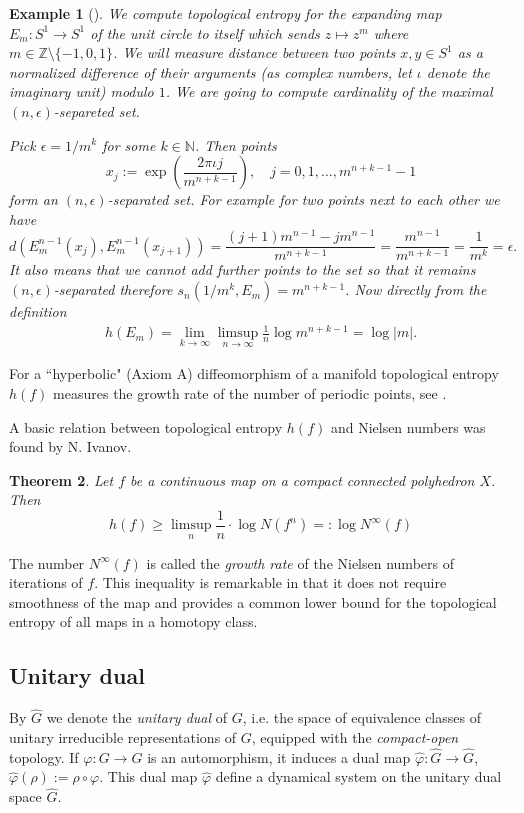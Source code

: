 \documentclass[12pt, a4paper]{amsart}
\def\r{\rho}
\newcommand{\wh}[1]{\widehat{#1}}
\newtheorem{theorem}{Theorem}
\newtheorem{example}[theorem]{Example}
\begin{document}
\begin{example}[]\label{ex:entropy-computation}
  We compute topological entropy for the expanding map $E_m: S^1 \to S^1$
  of the unit circle to itself which sends $z \mapsto z^m$ where $m \in \mathbb{Z} \setminus \{-1,0,1\}$.
  We will measure distance between two points $x,y \in S^1$ as a normalized difference of their arguments
  (as complex numbers, let $\iota$ denote the imaginary unit) modulo $1$.
  We are going to compute cardinality of the maximal $(n,\epsilon)$-separeted set.

  Pick $\epsilon = 1/m^{k}$ for some $k \in \mathbb{N}$.
  Then points
  \[
    x_j := \exp \left( \frac{2\pi\iota j}{m^{n+k-1}} \right), \quad j = 0, 1, \dots, m^{n+k-1}-1
  \]
  form an $(n,\epsilon)$-separated set.
  For example for two points next to each other we have
  \[
    d \left(E_m^{n-1} (x_j), E_m^{n-1} (x_{j+1}) \right)
    = \frac{(j+1)m^{n-1} - jm^{n-1}}{m^{n+k-1}}
    = \frac{m^{n-1}}{m^{n+k-1}} = \frac{1}{m^k} = \epsilon.
  \]
  It also means that we cannot add further points to the set so that it remains $(n,\epsilon)$-separated
  therefore $s_n(1/m^k, E_m) = m^{n+k-1}$.
  Now directly from the definition
  \begin{align*}
    h(E_m) = \lim_{k \to \infty} \limsup_{n \to \infty} \frac{1}{n} \log m^{n+k-1} = \log |m|.
  \end{align*}
\end{example}

For a ``hyperbolic" (Axiom A) diffeomorphism of a manifold topological entropy
$h(f)$ measures the growth rate of the number of periodic points, see \cite{KatHas}.

A basic relation between  topological entropy $h(f)$ and Nielsen numbers
was found by N. Ivanov.
\begin{theorem}\cite{I} \label{Iv}
  Let $f$ be a continuous map on a compact connected polyhedron $X$. Then
  $$
    h(f) \geq \limsup_{n} \frac{1}{n}\cdot\log N(f^n) =: {\log N^\infty(f)}
  $$
\end{theorem}
The number $N^\infty(f)$ is called the \emph{growth rate} of the Nielsen numbers of iterations of $f$.
This inequality is remarkable in that it does not require smoothness of the map and provides a common lower bound for the topological entropy of all maps in a homotopy class.


\subsection{Unitary dual}
By $\wh G$ we denote the \emph{unitary dual} of $G$, i.e.
the space of equivalence classes of
unitary irreducible representations of $G$, equipped with the
\emph{compact-open} topology.
If $\varphi: G\to G$ is an automorphism,
it induces a dual map $\wh\varphi:\wh G\to\wh G$, $\wh\varphi (\r):=\r\circ\varphi$.
This dual map $\wh\varphi$ define a dynamical system  on the unitary dual space $\widehat{G}$.
\end{document}
